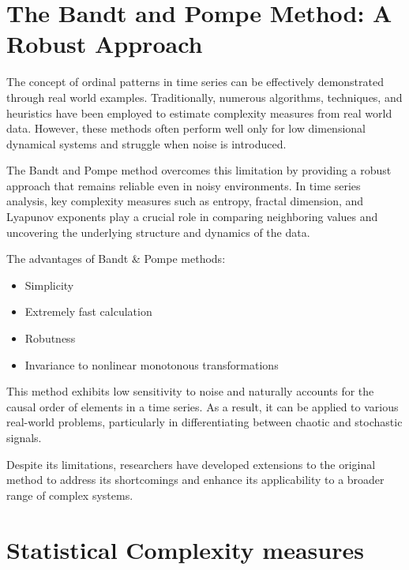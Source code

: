 \section*{The Bandt and Pompe Method: A Robust Approach}

The concept of ordinal patterns in time series can be effectively demonstrated through real world examples. Traditionally, numerous algorithms, techniques, and heuristics have been employed to estimate complexity measures from real world data. However, these methods often perform well only for low dimensional dynamical systems and struggle when noise is introduced.

The Bandt and Pompe method overcomes this limitation by providing a robust approach that remains reliable even in noisy environments. In time series analysis, key complexity measures such as entropy, fractal dimension, and Lyapunov exponents play a crucial role in comparing neighboring values and uncovering the underlying structure and dynamics of the data.

The advantages of Bandt \& Pompe methods:
\begin{itemize}
	\item Simplicity
	\item Extremely fast calculation
	\item Robutness
	\item Invariance to nonlinear monotonous transformations
\end{itemize}	

This method exhibits low sensitivity to noise and naturally accounts for the causal order of elements in a time series. As a result, it can be applied to various real-world problems, particularly in differentiating between chaotic and stochastic signals.

Despite its limitations, researchers have developed extensions to the original method to address its shortcomings and enhance its applicability to a broader range of complex systems.

\section*{Statistical Complexity measures}

